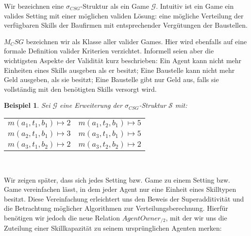 \documentclass[sigconf]{acmart}
\theoremstyle{break}
\newtheorem{bsp}{Beispiel}
\begin{document}
\noindent
Wir bezeichnen eine $\sigma_{CSG}$-Struktur als ein Game $\mathcal{G}$. Intuitiv ist ein Game ein valides Setting mit einer möglichen validen Lösung: eine mögliche Verteilung der verfügbaren Skills der Baufirmen mit entsprechender Vergütungen der Baustellen.

$M_CSG$ bezeichnen wir als Klasse aller valider Games. Hier wird ebenfalls auf eine formale Definition valider Kriterien verzichtet. Informell seien aber die wichtigsten Aspekte der Validität kurz beschrieben: Ein Agent kann nicht mehr Einheiten eines Skills ausgeben als er besitzt; Eine Baustelle kann nicht mehr Geld ausgeben, als sie besitzt; Eine Baustelle gibt nur Geld aus, falls sie vollständig mit den benötigten Skills versorgt wird.

\newpage
\begin{bsp}
  Sei $\mathcal{G}$ eine Erweiterung der $\sigma_{CSG}$-Struktur $\mathcal{S}$ mit: \\

  \noindent
  \setlength{\tabcolsep}{24pt}
  \begin{tabular}{l|l}
    $m(a_1, t_1, b_1) \mapsto 2 $&$ m(a_1, t_2, b_1) \mapsto 5$ \\
    $m(a_2, t_1, b_1) \mapsto 3 $&$ m(a_3, t_1, b_1) \mapsto 5$ \\
    $m(a_3, t_1, b_2) \mapsto 2 $&$ m(a_3, t_2, b_2) \mapsto 2$
  \end{tabular}
  \\
\end{bsp}

\noindent
Wir zeigen später, dass sich jedes Setting bzw. Game zu einem Setting bzw. Game vereinfachen lässt, in dem jeder Agent nur eine Einheit eines Skilltypen besitzt. Diese Vereinfachung erleichtert uns den Beweis der Superadditivität und die Betrachtung möglicher Algorithmen zur Verteilungsberechnung. Hierfür benötigen wir jedoch die neue Relation $AgentOwner_{/2}$, mit der wir uns die Zuteilung einer Skillkapazität zu seinem ursprünglichen Agenten merken:
\end{document}
